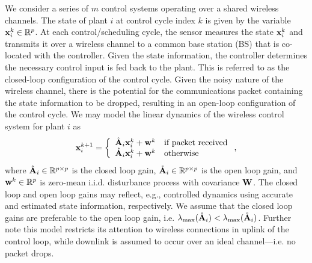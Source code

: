 

%

We consider a series of $m$ control systems operating over a shared wireless channels. The state of plant $i$ at control cycle index $k$ is given by the variable ${\mathbf x}^k_i \in {\mathbb R}^p$. At each control/scheduling cycle, the sensor measures the state ${\mathbf x}^k_i$ and transmits it over a wireless channel to a common base station (BS) that is co-located with the controller. Given the state information, the controller determines the necessary control input is fed back to the plant. This is referred to as the closed-loop configuration of the control cycle. Given the noisy nature of the wireless channel, there is the potential for the communications packet containing the state information to be dropped, resulting in an open-loop configuration of the control cycle. We may model the linear dynamics of the wireless control system for plant $i$ as
%
\begin{equation}\label{eq:system}
	\bbx_i^{k+1} = \left\{ \begin{array}{ll} \hbA_i \bbx^k_i + \bbw^k &\text{if packet received} \\ \mathring{\bbA}_i \bbx^k_i + \bbw^k & \text{otherwise} \end{array} \right.,
\end{equation}
%
where ${\hat{\mathbf A} }_i \in {\mathbb R}^{p\times p}$ is the closed loop gain, $\mathring{{\mathbf A}}_i \in {\mathbb R}^{p\times p}$ is the open loop gain, and ${\mathbf w}^k \in {\mathbb R}^p$ is zero-mean i.i.d. disturbance process with covariance ${\mathbf W}$. The closed loop and open loop gains may reflect, e.g., controlled dynamics using accurate and estimated state information, respectively. We assume that the closed loop gains are preferable to the open loop gain, i.e. $\lambda_{\max}({\hat{\mathbf A} }_i) < \lambda_{\max}(\mathring{{\mathbf A}}_i)$. Further note this model restricts its attention to wireless connections in uplink of the control loop, while downlink is assumed to occur over an ideal channel---i.e. no packet drops.
%

